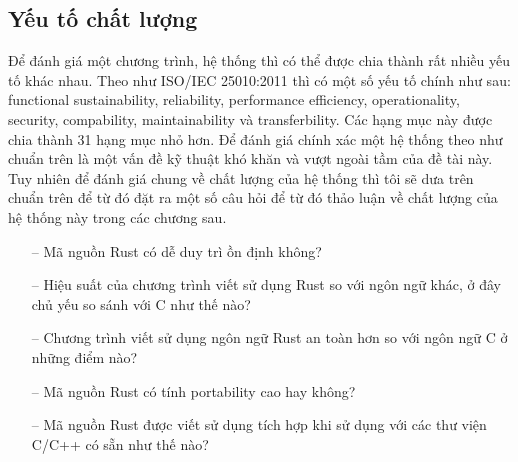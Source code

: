 \subsection{Yếu tố chất lượng}
Để đánh giá một chương trình, hệ thống thì có thể được chia thành rất nhiều yếu tố khác nhau.
Theo như ISO/IEC 25010:2011 thì có một số yếu tố chính như sau: functional sustainability, reliability, performance efficiency, operationality, security, compability, maintainability và transferbility. Các hạng mục này được chia thành 31 hạng mục nhỏ hơn.
Để đánh giá chính xác một hệ thống theo như chuẩn trên là một vấn đề kỹ thuật khó khăn và vượt ngoài tầm của đề tài này.
Tuy nhiên để đánh giá chung về chất lượng của hệ thống thì tôi sẽ dưa trên chuẩn trên để từ đó đặt ra một số câu hỏi để từ đó thảo luận về chất lượng của hệ thống này trong các chương sau.
\begin{itemize}
    \item[--] Mã nguồn Rust có dễ duy trì ồn định không?
    \item[--] Hiệu suất của chương trình viết sử dụng Rust so với ngôn ngữ khác, ở đây chủ yếu so sánh với C như thế nào?
    \item[--] Chương trình viết sử dụng ngôn ngữ Rust an toàn hơn so với ngôn ngữ C ở những điểm nào?
    \item[--] Mã nguồn Rust có tính portability cao hay không?
    \item[--] Mã nguồn Rust được viết sử dụng tích hợp khi sử dụng với các thư viện C/C++ có sẵn như thế nào?
\end{itemize}
